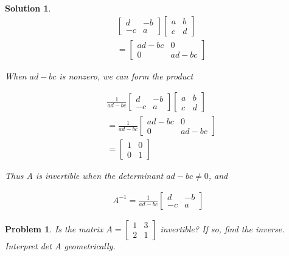 \documentclass{article}
\newtheorem{problem}{Problem}
\newtheorem*{solution}{Solution}
\begin{document}
\begin{solution}
\begin{align*}
& \begin{bmatrix}d & -b \\ -c & a \end{bmatrix}
\begin{bmatrix} a & b \\ c & d \end{bmatrix} \\
&= \begin{bmatrix} ad - bc & 0 \\ 0 & ad - bc \end{bmatrix}
\end{align*}

When $ad - bc$ is nonzero, we can form the product

\begin{align*}
& \displaystyle \frac{1}{ad-bc} \begin{bmatrix}d & -b \\ -c & a \end{bmatrix}
\begin{bmatrix} a & b \\ c & d \end{bmatrix} \\
&= \displaystyle \frac{1}{ad-bc} \begin{bmatrix} ad - bc & 0 \\ 0 & ad - bc \end{bmatrix} \\
&= \begin{bmatrix} 1 & 0 \\ 0 & 1 \end{bmatrix}
\end{align*}

Thus A is invertible when the determinant $ad - bc \neq 0$, and 

\begin{align*}
A^{-1} = \displaystyle \frac{1}{ad-bc} \begin{bmatrix}d & -b \\ -c & a \end{bmatrix}
\end{align*}

\end{solution}

\begin{problem}
Is the matrix $A = \begin{bmatrix}1 & 3 \\ 2 & 1\end{bmatrix}$ invertible? If so, find the inverse. Interpret det A geometrically.
\end{problem}
\end{document}
